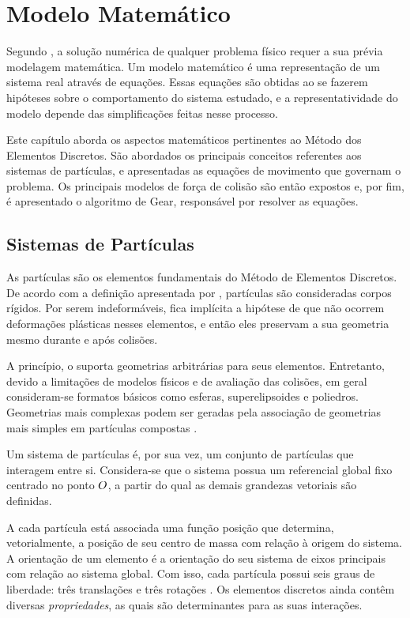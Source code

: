 \chapter{Modelo Matemático} \label{ch:mathematical_model}

Segundo , a solução numérica de qualquer problema físico requer a sua prévia modelagem matemática. Um modelo matemático é uma representação de um sistema real através de equações. Essas equações são obtidas ao se fazerem hipóteses sobre o comportamento do sistema estudado, e a representatividade do modelo depende das simplificações feitas nesse processo.

Este capítulo aborda os aspectos matemáticos pertinentes ao Método dos Elementos Discretos. São abordados os principais conceitos referentes aos sistemas de partículas, e apresentadas as equações de movimento que governam o problema. Os principais modelos de força de colisão são então expostos e, por fim, é apresentado o algoritmo de Gear, responsável por resolver as equações.

\section{Sistemas de Partículas} \label{sec:particle_systems}

As partículas são os elementos fundamentais do Método de Elementos Discretos. De acordo com a definição apresentada por , partículas são consideradas corpos rígidos. Por serem indeformáveis, fica implícita a hipótese de que não ocorrem deformações plásticas nesses elementos, e então eles preservam a sua geometria mesmo durante e após colisões.

A princípio, o \DEM{} suporta geometrias arbitrárias para seus elementos. Entretanto, devido a limitações de modelos físicos e de avaliação das colisões, em geral consideram-se formatos básicos como esferas, superelipsoides e poliedros. Geometrias mais complexas podem ser geradas pela associação de geometrias mais simples em partículas compostas \cite{bib:sampaio,bib:computational_granular_dynamics}.

Um sistema de partículas é, por sua vez, um conjunto de partículas que interagem entre si. Considera-se que o sistema possua um referencial global fixo centrado no ponto \(O\), a partir do qual as demais grandezas vetoriais são definidas.

A cada partícula está associada uma função posição que determina, vetorialmente, a posição de seu centro de massa com relação à origem do sistema. A orientação de um elemento é a orientação do seu sistema de eixos principais com relação ao sistema global. Com isso, cada partícula possui seis graus de liberdade: três translações e três rotações \cite{bib:sampaio}. Os elementos discretos ainda contêm diversas \textit{propriedades}, as quais são determinantes para as suas interações.


